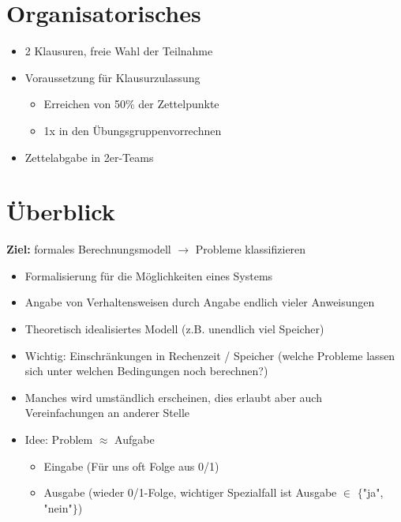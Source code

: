 
\section*{Organisatorisches}

\begin{itemize}
    \item 2 Klausuren, freie Wahl der Teilnahme
    \item Voraussetzung für Klausurzulassung
    \begin{itemize}
        \item Erreichen von 50\% der Zettelpunkte
        \item 1x in den Übungsgruppenvorrechnen
    \end{itemize}
    \item Zettelabgabe in 2er-Teams
\end{itemize}

\section{Überblick}

\textbf{Ziel:} formales Berechnungsmodell $\rightarrow$ Probleme klassifizieren
\begin{itemize}
    \item Formalisierung für die Möglichkeiten eines Systems
    \item Angabe von Verhaltensweisen durch Angabe endlich vieler Anweisungen
    \item Theoretisch idealisiertes Modell (z.B. unendlich viel Speicher)
    \item Wichtig: Einschränkungen in Rechenzeit / Speicher (welche Probleme lassen sich unter welchen Bedingungen noch berechnen?)
    \item Manches wird umständlich erscheinen, dies erlaubt aber auch Vereinfachungen an anderer Stelle
    \item Idee: Problem $\approx$ Aufgabe
    \begin{itemize}
        \item Eingabe (Für uns oft Folge aus 0/1)
        \item Ausgabe (wieder 0/1-Folge, wichtiger Spezialfall ist Ausgabe $\in$ $\{$"ja", "nein"$\}$)
    \end{itemize}
\end{itemize}

\pagebreak

